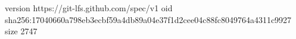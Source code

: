 version https://git-lfs.github.com/spec/v1
oid sha256:17040660a798eb3ecbf59a4db89a04e37f1d2cee04c88fc8049764a4311c9927
size 2747
